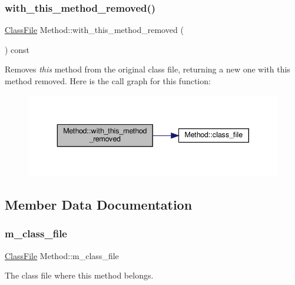 \subsubsection{\texorpdfstring{with\+\_\+this\+\_\+method\+\_\+removed()}{with\_this\_method\_removed()}}
{\footnotesize\ttfamily \hyperlink{classfile_8h_a00b46b60bc40e813e9fb1bb049174346}{Class\+File} Method\+::with\+\_\+this\+\_\+method\+\_\+removed (\begin{DoxyParamCaption}{ }\end{DoxyParamCaption}) const}

Removes {\itshape this} method from the original class file, returning a new one with this method removed. Here is the call graph for this function\+:
\nopagebreak
\begin{figure}[H]
\begin{center}
\leavevmode
\includegraphics[width=343pt]{classMethod_a52e769352ce657232db3a1b936e930b1_cgraph}
\end{center}
\end{figure}


\subsection{Member Data Documentation}
\mbox{\label{classMethod_a6dddd514810b6e9230d554ceb5507a4c}} 
\subsubsection{\texorpdfstring{m\+\_\+class\+\_\+file}{m\_class\_file}}
{\footnotesize\ttfamily \hyperlink{classfile_8h_a00b46b60bc40e813e9fb1bb049174346}{Class\+File} Method\+::m\+\_\+class\+\_\+file\hspace{0.3cm}{\ttfamily [private]}}



The class file where this method belongs. 

\mbox{\label{classMethod_a6d573fa18b21d15b361111bf03f48a74}} 
